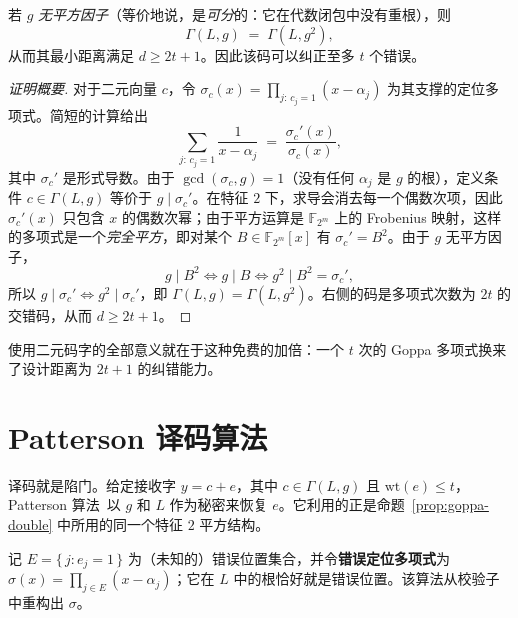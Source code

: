 \begin{proposition}
\label{prop:goppa-double}
若 $g$ \emph{无平方因子}（等价地说，是\emph{可分}的：它在代数闭包中没有重根），则
\[
\Gamma(L,g) \;=\; \Gamma(L,g^2),
\]
从而其最小距离满足 $d \ge 2t+1$。因此该码可以纠正至多 $t$ 个错误。
\end{proposition}

\begin{proof}[证明概要]
对于二元向量 $c$，令 $\sigma_c(x)=\prod_{j:\,c_j=1}(x-\alpha_j)$ 为其支撑的定位多项式。简短的计算给出
\[
\sum_{j:\,c_j=1}\frac{1}{x-\alpha_j} \;=\; \frac{\sigma_c'(x)}{\sigma_c(x)},
\]
其中 $\sigma_c'$ 是形式导数。由于 $\gcd(\sigma_c,g)=1$（没有任何 $\alpha_j$ 是 $g$ 的根），定义条件 $c\in\Gamma(L,g)$ 等价于 $g \mid \sigma_c'$。在特征 $2$ 下，求导会消去每一个偶数次项，因此 $\sigma_c'(x)$ 只包含 $x$ 的偶数次幂；由于平方运算是 $\mathbb{F}_{2^m}$ 上的 Frobenius 映射，这样的多项式是一个\emph{完全平方}，即对某个 $B\in\mathbb{F}_{2^m}[x]$ 有 $\sigma_c'=B^2$。由于 $g$ 无平方因子，
\[
g \mid B^2 \iff g \mid B \iff g^2 \mid B^2=\sigma_c',
\]
所以 $g\mid\sigma_c' \Leftrightarrow g^2\mid\sigma_c'$，即 $\Gamma(L,g)=\Gamma(L,g^2)$。右侧的码是多项式次数为 $2t$ 的交错码，从而 $d\ge 2t+1$。
\end{proof}

使用二元码字的全部意义就在于这种免费的加倍：一个 $t$ 次的 Goppa 多项式换来了设计距离为 $2t+1$ 的纠错能力。

\section{Patterson 译码算法}

译码就是陷门。给定接收字 $y=c+e$，其中 $c\in\Gamma(L,g)$ 且 $\mathrm{wt}(e)\le t$，Patterson 算法~\cite{patterson1975}以 $g$ 和 $L$ 作为秘密来恢复 $e$。它利用的正是命题~\ref{prop:goppa-double} 中所用的同一个特征 $2$ 平方结构。

记 $E=\{\,j: e_j=1\,\}$ 为（未知的）错误位置集合，并令\textbf{错误定位多项式}为 $\sigma(x)=\prod_{j\in E}(x-\alpha_j)$；它在 $L$ 中的根恰好就是错误位置。该算法从校验子中重构出 $\sigma$。


